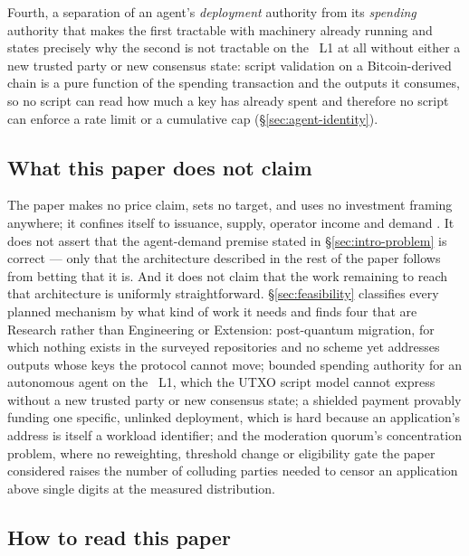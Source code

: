 Fourth, a separation of an agent's \emph{deployment} authority from its \emph{spending} authority
that makes the first tractable with machinery already running and states precisely why the second is
not tractable on the \Flux\ L1 at all without either a new trusted party or new consensus state:
script validation on a Bitcoin-derived chain is a pure function of the spending transaction and the
outputs it consumes, so no script can read how much a key has already spent and therefore no script
can enforce a rate limit or a cumulative cap \planned (\S\ref{sec:agent-identity}).

\subsection{What this paper does not claim}
\label{sec:intro-not}

The paper makes no price claim, sets no target, and uses no investment framing anywhere; it confines
itself to issuance, supply, operator income and demand
. It does not assert that the agent-demand premise stated in
\S\ref{sec:intro-problem} is correct — only that the architecture described in the rest of the paper
follows from betting that it is. And it does not claim that the work remaining to reach that
architecture is uniformly straightforward. \S\ref{sec:feasibility} classifies every planned mechanism
by what kind of work it needs and finds four that are Research rather than Engineering or Extension:
post-quantum migration, for which nothing exists in the surveyed repositories and no scheme yet
addresses outputs whose keys the protocol cannot move; bounded spending authority for an autonomous
agent on the \Flux\ L1, which the UTXO script model cannot express without a new trusted party or new
consensus state; a shielded payment provably funding one specific, unlinked deployment, which is hard
because an application's address is itself a workload identifier; and the moderation quorum's
concentration problem, where no reweighting, threshold change or eligibility gate the paper considered
raises the number of colluding parties needed to censor an application above single digits at the
measured distribution.

\subsection{How to read this paper}
\label{sec:intro-howtoread}


